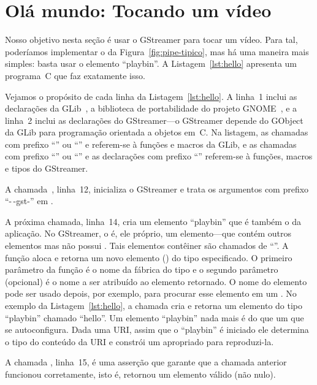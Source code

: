 \documentclass{SBCbookchapter}
\begin{document}

\section{Olá mundo: Tocando um vídeo}
\label{sec:hello}

Nosso objetivo nesta seção é usar o GStreamer para tocar um vídeo.  Para tal,
poderíamos implementar o  da Figura~\ref{fig:pipe-tipico}, mas há
uma maneira mais simples: basta usar o elemento ``playbin''.  A
Listagem~\ref{lst:hello} apresenta um programa~C que faz exatamente isso.



Vejamos o propósito de cada linha da Listagem~\ref{lst:hello}.  A linha~1
inclui as declarações da GLib~\cite{glib}, a biblioteca de portabilidade do
projeto GNOME~\cite{gnome}, e a linha~2 inclui as declarações do
GStreamer---o GStreamer depende do  GObject~\cite{gobject} da
GLib para programação orientada a objetos em~C\null.  Na listagem, as
chamadas com prefixo ``'' ou ``'' e referem-se à funções e
macros da GLib, e as chamadas com prefixo ``'' ou ``'' e as
declarações com prefixo ``'' referem-se à funções, macros e tipos do
GStreamer.

A chamada~, linha~12, inicializa o GStreamer e trata os
argumentos com prefixo ``-\,-gst-'' em .

A próxima chamada, linha~14, cria um elemento ``playbin'' que é também o
 da aplicação.  No GStreamer, o  é, ele próprio, um
elemento---que contém outros elementos mas não possui .
Tais elementos contêiner são chamados de ``''.  
A função  aloca
e retorna um novo elemento () do tipo especificado.  O primeiro
parâmetro da função é o nome da fábrica do tipo e o segundo parâmetro
(opcional) é o nome a ser atribuído ao elemento retornado.  O nome do elemento
pode ser usado depois, por exemplo, para procurar esse elemento em um
.  No exemplo da Listagem~\ref{lst:hello}, a chamada cria e
retorna um elemento do tipo ``playbin'' chamado ``hello''.  Um elemento
``playbin'' nada mais é do que um  que se autoconfigura.  Dada uma
URI, assim que o ``playbin'' é iniciado ele determina o tipo do conteúdo da URI
e constrói um  apropriado para reproduzi-la.

A chamada , linha~15, é uma asserção que garante que a
chamada anterior funcionou corretamente, isto é, retornou um elemento válido
(não nulo).
\end{document}
